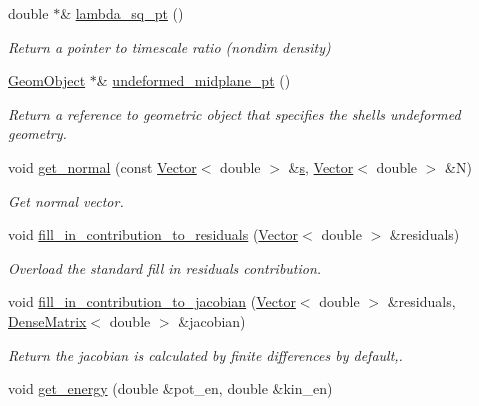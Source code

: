 \begin{DoxyCompactItemize}
double $\ast$\& \hyperlink{classoomph_1_1KirchhoffLoveShellEquations_a60304ab87837d6acfa4cde2d94dd2a89}{lambda\+\_\+sq\+\_\+pt} ()
\begin{DoxyCompactList}\small\item\em Return a pointer to timescale ratio (nondim density) \end{DoxyCompactList}\item 
\hyperlink{classoomph_1_1GeomObject}{Geom\+Object} $\ast$\& \hyperlink{classoomph_1_1KirchhoffLoveShellEquations_a99b8f95b8b06891fb1df0966157947d8}{undeformed\+\_\+midplane\+\_\+pt} ()
\begin{DoxyCompactList}\small\item\em Return a reference to geometric object that specifies the shell\textquotesingle{}s undeformed geometry. \end{DoxyCompactList}\item 
void \hyperlink{classoomph_1_1KirchhoffLoveShellEquations_a797e455634ac8b8e8669c4adff84e644}{get\+\_\+normal} (const \hyperlink{classoomph_1_1Vector}{Vector}$<$ double $>$ \&\hyperlink{cfortran_8h_ab7123126e4885ef647dd9c6e3807a21c}{s}, \hyperlink{classoomph_1_1Vector}{Vector}$<$ double $>$ \&N)
\begin{DoxyCompactList}\small\item\em Get normal vector. \end{DoxyCompactList}\item 
void \hyperlink{classoomph_1_1KirchhoffLoveShellEquations_a98020c975dd08c1faf3ecbe8f127788d}{fill\+\_\+in\+\_\+contribution\+\_\+to\+\_\+residuals} (\hyperlink{classoomph_1_1Vector}{Vector}$<$ double $>$ \&residuals)
\begin{DoxyCompactList}\small\item\em Overload the standard fill in residuals contribution. \end{DoxyCompactList}\item 
void \hyperlink{classoomph_1_1KirchhoffLoveShellEquations_a2c8049fa371d484a43e157ebef54b474}{fill\+\_\+in\+\_\+contribution\+\_\+to\+\_\+jacobian} (\hyperlink{classoomph_1_1Vector}{Vector}$<$ double $>$ \&residuals, \hyperlink{classoomph_1_1DenseMatrix}{Dense\+Matrix}$<$ double $>$ \&jacobian)
\begin{DoxyCompactList}\small\item\em Return the jacobian is calculated by finite differences by default,. \end{DoxyCompactList}\item 
void \hyperlink{classoomph_1_1KirchhoffLoveShellEquations_a766bde0ab2904a6d73e2fa116dfa8738}{get\+\_\+energy} (double \&pot\+\_\+en, double \&kin\+\_\+en)

\end{DoxyCompactItemize}
